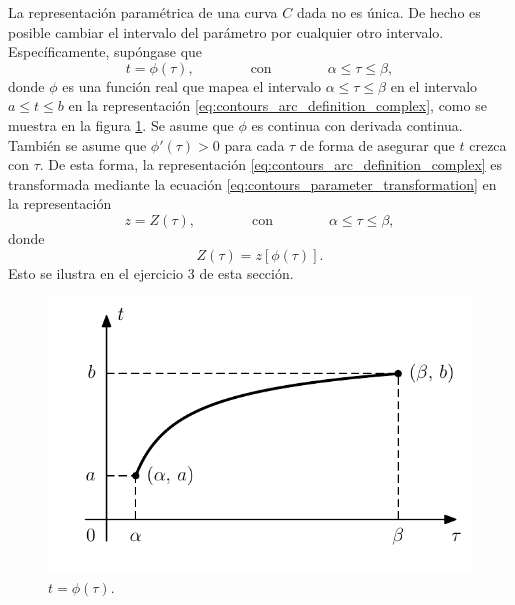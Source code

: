 \documentclass[a4paper]{report}
\begin{document}
La representación paramétrica de una curva \(C\) dada no es única. De hecho es posible cambiar el intervalo del parámetro por cualquier otro intervalo. Específicamente, supóngase que 
\begin{equation}\label{eq:contours_parameter_transformation}
 t=\phi(\tau),\qquad\qquad\textrm{con}\qquad\qquad\alpha\leq\tau\leq\beta, 
\end{equation}
donde \(\phi\) es una función real que mapea el intervalo \(\alpha\leq\tau\leq\beta\) en el intervalo \(a\leq t\leq b\) en la representación \ref{eq:contours_arc_definition_complex}, como se muestra en la figura \ref{fig:contours_parameter_transformation}. Se asume que \(\phi\) es continua con derivada continua. También se asume que \(\phi'(\tau)>0\) para cada \(\tau\) de forma de asegurar que \(t\) crezca con \(\tau\). De esta forma, la representación \ref{eq:contours_arc_definition_complex} es transformada mediante la ecuación \ref{eq:contours_parameter_transformation} en la representación
\begin{equation}\label{eq:contours_arc_transformation_complex}
 z=Z(\tau),\qquad\qquad\textrm{con}\qquad\qquad\alpha\leq\tau\leq\beta, 
\end{equation}
donde
\[
 Z(\tau)=z[\phi(\tau)].
\]
Esto se ilustra en el ejercicio 3 de esta sección.
\begin{figure}[!htb]
  \begin{minipage}[c]{0.5\textwidth}
    \includegraphics[width=\textwidth]{figuras/contours_parameter_transformation.pdf}
  \end{minipage}\hfill
  \begin{minipage}[c]{0.4\textwidth}
    \caption{
       \(t=\phi(\tau)\).
    }\label{fig:contours_parameter_transformation}
  \end{minipage}
\end{figure}
\end{document}
